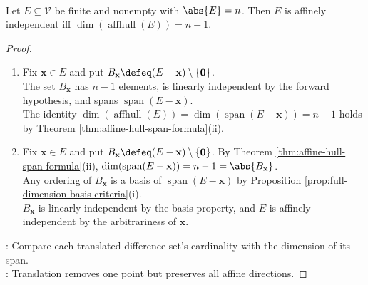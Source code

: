 \begin{corollary} \label{cor:finite-affine-independence-dimension-criterion} \\
Let $E\subseteq\mathcal{V}$ be finite and nonempty with $\abs{E}=n$. Then $E$ is affinely independent iff $\dim(\operatorname{affhull}(E))=n-1$.
\begin{proof}
\begin{enumerate}[label=\roman*.]
\setlength{\itemsep}{0pt}
\item[$(\Rightarrow)$] Fix $\mathbf{x}\in E$ and put $B_{\mathbf{x}}\defeq(E-\mathbf{x})\setminus\{\mathbf{0}\}$.\\
The set $B_{\mathbf{x}}$ has $n-1$ elements, is linearly independent by the forward hypothesis, and spans $\operatorname{span}(E-\mathbf{x})$.\\
The identity $\dim(\operatorname{affhull}(E))=\dim(\operatorname{span}(E-\mathbf{x}))=n-1$ holds by Theorem \ref{thm:affine-hull-span-formula}(ii).
\item[$(\Leftarrow)$] Fix $\mathbf{x}\in E$ and put $B_{\mathbf{x}}\defeq(E-\mathbf{x})\setminus\{\mathbf{0}\}$. By Theorem \ref{thm:affine-hull-span-formula}(ii), $\dim(\operatorname{span}(E-\mathbf{x}))=n-1=\abs{B_{\mathbf{x}}}$.\\
Any ordering of $B_{\mathbf{x}}$ is a basis of $\operatorname{span}(E-\mathbf{x})$ by Proposition \ref{prop:full-dimension-basis-criteria}(i).\\
$B_{\mathbf{x}}$ is linearly independent by the basis property, and $E$ is affinely independent by the arbitrariness of $\mathbf{x}$.
\end{enumerate}
: Compare each translated difference set's cardinality with the dimension of its span.\\
: Translation removes one point but preserves all affine directions.
\end{proof}
\end{corollary}

